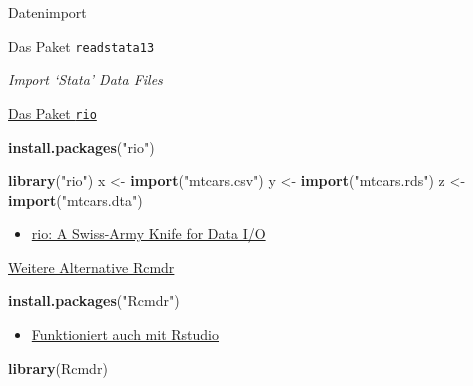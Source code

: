 \documentclass[ignorenonframetext,]{beamer}
\newenvironment{Shaded}{}{}
\newcommand{\KeywordTok}[1]{\textcolor[rgb]{0.00,0.44,0.13}{\textbf{{#1}}}}
\newcommand{\StringTok}[1]{\textcolor[rgb]{0.25,0.44,0.63}{{#1}}}
\newcommand{\NormalTok}[1]{{#1}}
\providecommand{\tightlist}{%
\setlength{\itemsep}{0pt}\setlength{\parskip}{0pt}}
\begin{document}
\begin{frame}[fragile]{Datenimport}
\begin{block}{Das Paket \texttt{readstata13}}
\begin{block}{\emph{Import `Stata' Data Files}}
\end{block}

\end{block}

\begin{block}{\href{https://cran.r-project.org/web/packages/rio/vignettes/rio.html}{Das
Paket \texttt{rio}}}

\begin{Shaded}
\begin{Highlighting}[]
\KeywordTok{install.packages}\NormalTok{(}\StringTok{"rio"}\NormalTok{)}
\end{Highlighting}
\end{Shaded}

\begin{Shaded}
\begin{Highlighting}[]
\KeywordTok{library}\NormalTok{(}\StringTok{"rio"}\NormalTok{)}
\NormalTok{x <-}\StringTok{ }\KeywordTok{import}\NormalTok{(}\StringTok{"mtcars.csv"}\NormalTok{)}
\NormalTok{y <-}\StringTok{ }\KeywordTok{import}\NormalTok{(}\StringTok{"mtcars.rds"}\NormalTok{)}
\NormalTok{z <-}\StringTok{ }\KeywordTok{import}\NormalTok{(}\StringTok{"mtcars.dta"}\NormalTok{)}
\end{Highlighting}
\end{Shaded}

\begin{itemize}
\tightlist
\item
  \href{https://cran.r-project.org/web/packages/rio/README.html}{rio: A
  Swiss-Army Knife for Data I/O}
\end{itemize}

\end{block}

\begin{block}{\href{https://cran.r-project.org/web/packages/Rcmdr/index.html}{Weitere
Alternative Rcmdr}}

\begin{Shaded}
\begin{Highlighting}[]
\KeywordTok{install.packages}\NormalTok{(}\StringTok{"Rcmdr"}\NormalTok{)}
\end{Highlighting}
\end{Shaded}

\begin{itemize}
\tightlist
\item
  \href{http://www.rcommander.com/}{Funktioniert auch mit Rstudio}
\end{itemize}

\begin{Shaded}
\begin{Highlighting}[]
\KeywordTok{library}\NormalTok{(Rcmdr)}
\end{Highlighting}
\end{Shaded}


\end{block}
\end{frame}
\end{document}
